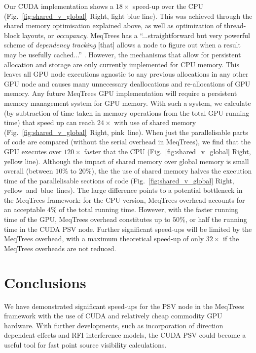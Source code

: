 Our CUDA implementation shows a $18\times$ speed-up over the CPU (Fig.~\ref{fig:shared_v_global}~Right, light blue line). This was achieved through the shared memory optimisation explained above, as well as optimization of  thread-block layouts, or \emph{occupancy}.  MeqTrees has a ``...straightforward but very powerful scheme of \emph{dependency tracking} [that] allows a node to figure out when a result may be usefully cached...'' \citep{Noordam2011}. However,  the mechanisms that allow for persistent allocation and storage are only currently implemented for CPU memory. This leaves all GPU node executions agnostic to any previous allocations in any other GPU node and causes many unnecessary deallocations and re-allocations of GPU memory. Any future MeqTrees GPU implementation will require a persistent memory management system for GPU memory. With such a system, we calculate (by subtraction of time taken in memory operations from the total GPU running time) that speed up can reach $24\times$ with use of shared memory (Fig.~\ref{fig:shared_v_global}~Right, pink~line). When just the parallelisable parts of code are compared (without the serial overhead in MeqTrees), we find that the GPU executes over $120\times$ faster that the CPU (Fig.~\ref{fig:shared_v_global} Right, yellow line). Although the impact of shared memory over global memory is small overall (between $10\%$ to $20\%$), the the use of shared memory halves the execution time of the parallelisable sections of code (Fig.~\ref{fig:shared_v_global} Right, yellow~and~blue~lines). The large difference points to a potential bottleneck in the MeqTrees framework: for the CPU version, MeqTrees overhead accounts for an acceptable $4\%$ of the total running time. However, with the faster running time of the GPU, MeqTrees overhead constitutes up to $50\%$, or half the running time in the CUDA PSV node. Further significant speed-ups will be limited by the MeqTrees overhead, with a maximum theoretical speed-up of only $32\times$ if the MeqTrees overheads are not reduced.

\section{Conclusions}

We have demonstrated significant speed-ups for the PSV node in the MeqTrees framework with the use of  CUDA and relatively cheap commodity GPU hardware. With further developments, such as  incorporation of direction dependent effects and RFI interference models, the CUDA PSV could become a useful tool for fast point source visibility calculations.



